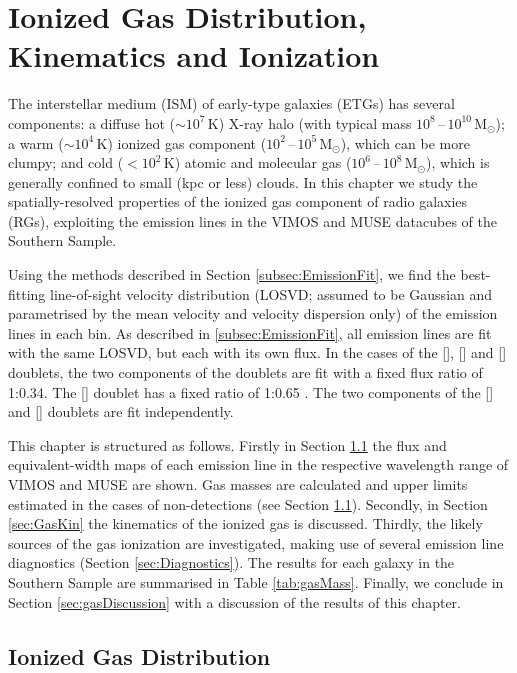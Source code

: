 \chapter{Ionized Gas Distribution, Kinematics and Ionization}
	\label{cha:gas}
The interstellar medium (ISM) of early-type galaxies (ETGs) has several components: a diffuse hot ($\sim 10^7 \, \mathrm{K}$) X-ray halo (with typical mass $10^8$\,--\,$10^{10} \, \mathrm{M_\odot}$); a warm ($\sim 10^4 \, \mathrm{K}$) ionized gas component ($10^2$\,--\,$10^5 \, \mathrm{M_\odot}$), which can be more clumpy; and cold ($<10^2 \, \mathrm{K}$) atomic and molecular gas ($10^6$\,--\,$10^8 \, \mathrm{M_\odot}$), which is generally confined to small (kpc or less) clouds. In this chapter we study the spatially-resolved properties of the ionized gas component of radio galaxies (RGs), exploiting the emission lines in the VIMOS and MUSE datacubes of the Southern Sample.

Using the methods described in Section \ref{subsec:EmissionFit}, we find the best-fitting line-of-sight velocity distribution (LOSVD; assumed to be Gaussian and parametrised by the mean velocity and velocity dispersion only) of the emission lines in each bin. As described in \ref{subsec:EmissionFit}, all emission lines are fit with the same LOSVD, but each with its own flux. In the cases of the [], [] and [] doublets, the two components of the doublets are fit with a fixed flux ratio of 1:0.34. The [] doublet has a fixed ratio of 1:0.65 \citep{Safier1992}. The two components of the [] and [] doublets are fit independently.

This chapter is structured as follows. Firstly in Section \ref{sec:GasFlux} the flux and equivalent-width maps of each emission line in the respective wavelength range of VIMOS and MUSE are shown. Gas masses are calculated and upper limits estimated in the cases of non-detections (see Section \ref{sec:GasFlux}). Secondly, in Section \ref{sec:GasKin} the kinematics of the ionized gas is discussed. Thirdly, the likely sources of the gas ionization are investigated, making use of several emission line diagnostics (Section \ref{sec:Diagnostics}). The results for each galaxy in the Southern Sample are summarised in Table \ref{tab:gasMass}. Finally, we conclude in Section \ref{sec:gasDiscussion} with a discussion of the results of this chapter.



\section{Ionized Gas Distribution}
	\label{sec:GasFlux}

